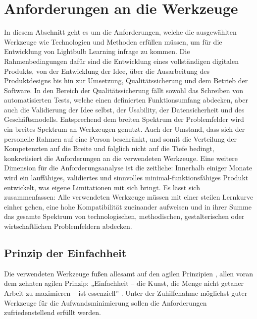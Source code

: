 \section{Anforderungen an die Werkzeuge}
\label{sec:reqtools}
In diesem Abschnitt geht es um die Anforderungen, welche die ausgewählten Werkzeuge wie Technologien und Methoden erfüllen müssen, um für die Entwicklung von Lightbulb Learning infrage zu kommen. Die Rahmenbedingungen dafür sind die Entwicklung eines vollständigen digitalen Produkts, von der Entwicklung der Idee, über die Ausarbeitung des Produktdesigns bis hin zur Umsetzung, Qualitätssicherung und dem Betrieb der Software. In den Bereich der Qualitätssicherung fällt sowohl das Schreiben von automatisierten Tests, welche einen definierten Funktionsumfang abdecken, aber auch die Validierung der Idee selbst, der Usability, der Datensicherheit und des Geschäftsmodells. Entsprechend dem breiten Spektrum der Problemfelder wird ein breites Spektrum an Werkzeugen genutzt. Auch der Umstand, dass sich der personelle Rahmen auf eine Person beschränkt, und somit die Verteilung der Kompetenzten auf die Breite und folglich nicht auf die Tiefe bedingt, konkretisiert die Anforderungen an die verwendeten Werkzeuge. Eine weitere Dimension für die Anforderungsanalyse ist die zeitliche: Innerhalb einiger Monate wird ein lauffähiges, validiertes und sinnvolles minimal-funktionsfähiges Produkt entwickelt, was eigene Limitationen mit sich bringt. Es lässt sich zusammenfassen: Alle verwendeten Werkzeuge müssen mit einer steilen Lernkurve einher gehen, eine hohe Kompatibilität zueinander aufweisen und in ihrer Summe das gesamte Spektrum von technologischen, methodischen, gestalterischen oder wirtschaftlichen Problemfeldern abdecken.

\subsection{Prinzip der Einfachheit}
Die verwendeten Werkzeuge fußen allesamt auf den agilen Prinzipien \cite[vgl.][]{beck2001}, allen voran dem zehnten agilen Prinzip: „Einfachheit -- die Kunst, die Menge nicht getaner Arbeit zu maximieren -- ist essenziell” \cite[10. Prinzip]{beck2001}. Unter der Zuhilfenahme möglichst guter Werkzeuge für die Aufwandsminimierung sollen die Anforderungen zufriedenstellend erfüllt werden.


